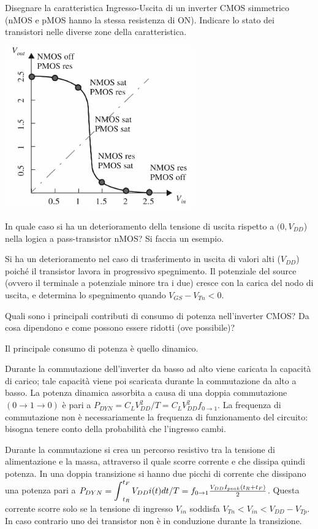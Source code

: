 \documentclass[answers,a4paper,12pt]{exam}
\newcommand{\bigint}{\mathop{\mathlarger{\int}}}
\begin{document}
\begin{questions}
\question Disegnare la caratteristica Ingresso-Uscita di un inverter CMOS simmetrico (nMOS e pMOS hanno la stessa resistenza di ON). Indicare lo stato dei transistori nelle diverse zone della caratteristica.
\begin{solutionorbox}[5cm]

    {
    \centering

    \includegraphics[height=7cm]{CurvaInverter.png}

}
\end{solutionorbox}
\question In quale caso si ha un deterioramento della tensione di uscita rispetto a $(0, V_{DD}$) nella logica a pass-transistor nMOS? Si faccia un esempio.
\begin{solutionorbox}[5cm]
    Si ha un deterioramento nel caso di trasferimento in uscita di valori alti ($V_{DD}$) poiché il transistor lavora in progressivo spegnimento. 
    Il potenziale del source (ovvero il terminale a potenziale minore tra i due) cresce con la carica del nodo di uscita, e determina lo spegnimento quando $V_{GS}-V_{Tn} < 0$.
\end{solutionorbox}
\question Quali sono i principali contributi di consumo di potenza nell’inverter CMOS? Da cosa dipendono e come possono essere ridotti (ove possibile)?
\begin{solutionorbox}[5cm]
Il principale consumo di potenza è quello dinamico.

Durante la commutazione dell'inverter da basso ad alto viene caricata la capacità di carico; tale capacità viene poi scaricata durante la commutazione da alto a basso. 
La potenza dinamica assorbita a causa di una doppia commutazione $(0 \rightarrow 1 \rightarrow 0)$ è pari a $P_{DYN} = C_L V_{DD}^2 / T = C_L V_{DD}^2 f_{0\rightarrow 1}$. 
La frequenza di commutazione non è necessariamente la frequenza di funzionamento del circuito: bisogna tenere conto della probabilità che l'ingresso cambi.

Durante la commutazione si crea un percorso resistivo tra la tensione di alimentazione e la massa, attraverso il quale scorre corrente e che dissipa quindi potenza.
In una doppia transizione si hanno due picchi di corrente che dissipano una potenza pari a $P_{DYN} = \bigint_{t_R}^{t_F} V_{DD} i (t) dt / T = f_{0\rightarrow 1} \frac{V_{DD} I_{peak}  (t_R + t_F)}{2}$. 
Questa corrente scorre solo se la tensione di ingresso $V_{in}$ soddisfa $V_{Tn} < V_{in} < V_{DD} - V_{Tp}$. In caso contrario uno dei transistor non è in conduzione durante la transizione.
\end{solutionorbox}
\end{questions}
\end{document}
